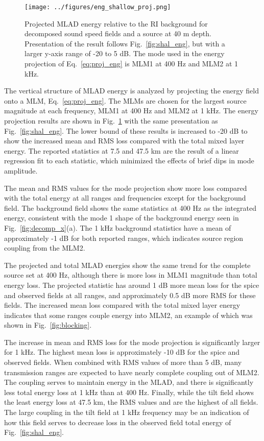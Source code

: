 \documentclass[preprint,NumberedRefs]{JASA}
\begin{document}
\begin{figure}
\texttt{[image: ../figures/eng\_shallow\_proj.png]}
    \caption{Projected MLAD energy relative to the RI background for decomposed sound speed fields and a source at 40 m depth. Presentation of the result follows Fig.~\ref{fig:shal_eng}, but with a larger y-axis range of -20 to 5 dB. The mode used in the energy projection of Eq.~\eqref{eq:proj_eng} is MLM1 at 400 Hz and MLM2 at 1 kHz.}
    \label{fig:shal_proj}
\end{figure}
The vertical structure of MLAD energy is analyzed by projecting the energy field onto a MLM, Eq.~\eqref{eq:proj_eng}. The MLMs are chosen for the largest source magnitude at each frequency, MLM1 at 400 Hz and MLM2 at 1 kHz. The energy projection results are shown in Fig.~\ref{fig:shal_proj} with the same presentation as Fig.~\ref{fig:shal_eng}. The lower bound of these results is increased to -20 dB to show the increased mean and RMS loss compared with the total mixed layer energy. The reported statistics at 7.5 and 47.5 km are the result of a linear regression fit to each statistic, which minimized the effects of brief dips in mode amplitude.

The mean and RMS values for the mode projection show more loss compared with the total energy at all ranges and frequencies except for the background field. The background field shows the same statistics at 400 Hz as the integrated energy, consistent with the mode 1 shape of the background energy seen in Fig.~\ref{fig:decomp_x}(a). The 1 kHz background statistics have a mean of approximately -1 dB for both reported ranges, which indicates source region coupling from the MLM2.

The projected and total MLAD energies show the same trend for the complete source set at 400 Hz, although there is more loss in MLM1 magnitude than total energy loss. The projected statistic has around 1 dB more mean loss for the spice and observed fields at all ranges, and approximately 0.5 dB more RMS for these fields. The increased mean loss compared with the total mixed layer energy indicates that some ranges couple energy into MLM2, an example of which was shown in Fig.~\ref{fig:blocking}.

The increase in mean and RMS loss for the mode projection is significantly larger for 1 kHz. The highest mean loss is approximately -10 dB for the spice and observed fields. When combined with RMS values of more than 5 dB, many transmission ranges are expected to have nearly complete coupling out of MLM2. The coupling serves to maintain energy in the MLAD, and there is significantly less total energy loss at 1 kHz than at 400 Hz. Finally, while the tilt field shows the least energy loss at 47.5 km, the RMS values and are the highest of all fields. The large coupling in the tilt field at 1 kHz frequency may be an indication of how this field serves to decrease loss in the observed field total energy of Fig.~\ref{fig:shal_eng}.
\end{document}
